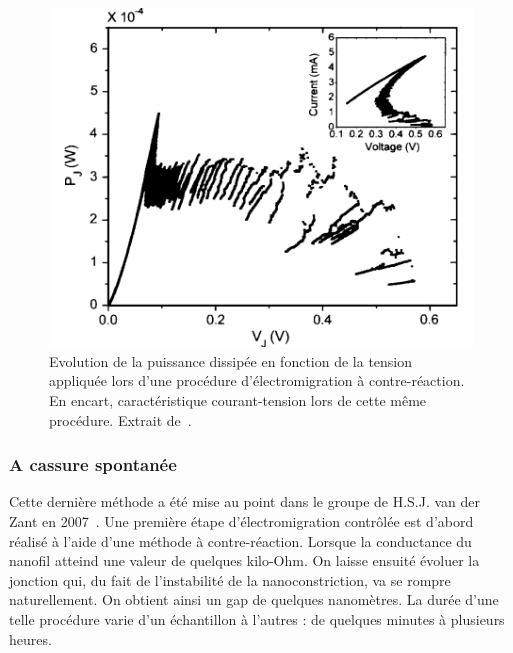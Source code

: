 \begin{figure}
\parbox{7cm}{
\includegraphics[scale=0.45]{Fabrication/ElecMigExemp/EseFig.pdf} 
}
\parbox{5cm}{\caption{Evolution de la puissance dissipée en fonction de la tension appliquée lors d'une procédure d'électromigration à contre-réaction. En encart, caractéristique courant-tension lors de cette m\^eme procédure. Extrait de~\cite{Esen2005}.}
\label{ParkExemp}
}
\end{figure}


\subsubsection{A cassure spontanée}
Cette dernière méthode a été mise au point dans le groupe de H.S.J. van der Zant en 2007~\cite{ONeill2007}. Une première étape d'électromigration contrôlée est d'abord réalisé à l'aide d'une méthode à contre-réaction. Lorsque la conductance du nanofil atteind une valeur de quelques kilo-Ohm. On laisse ensuité évoluer la jonction qui, du fait de l'instabilité de la nanoconstriction, va se rompre naturellement. On obtient ainsi un gap de quelques nanomètres. La durée d'une telle procédure varie d'un échantillon à l'autres : de quelques minutes à plusieurs heures.


